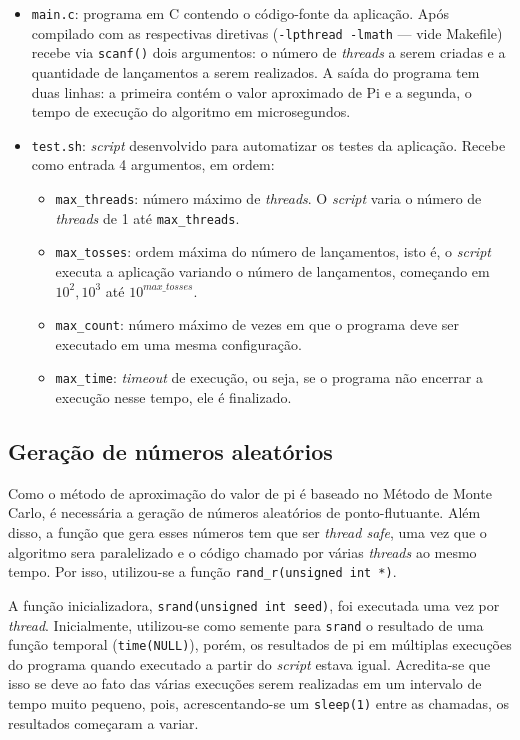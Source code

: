 \documentclass[12pt,a4paper]{article}
\begin{document}
\begin{itemize}
	\item \texttt{main.c}: programa em C contendo o código-fonte da aplicação. Após compilado com as respectivas diretivas
		(\texttt{-lpthread -lmath} --- vide Makefile) recebe via
		\texttt{scanf()} dois argumentos: o número de \textit{threads} a serem
		criadas e a quantidade de lançamentos a serem realizados. A saída do
		programa tem duas linhas: a primeira contém o valor aproximado de Pi e
		a segunda, o tempo de execução do algoritmo em microsegundos.
	\item \texttt{test.sh}: \textit{script} desenvolvido para automatizar os
		testes da aplicação. Recebe como entrada 4 argumentos, em ordem:
		\begin{itemize}
			\item \texttt{max\_threads}: número máximo de \textit{threads}. O
				\textit{script} varia o número de \textit{threads} de 1 até
				\texttt{max\_threads}.
			\item \texttt{max\_tosses}: ordem máxima do número de lançamentos, isto
				é, o \textit{script} executa a aplicação variando o 
				número de lançamentos, começando em $10^2, 10^3$ até $10^{max\_tosses}$.
			\item \texttt{max\_count}: número máximo de vezes em que o programa
				deve ser executado em uma mesma configuração.
			\item \texttt{max\_time}: \textit{timeout} de execução, ou seja, se o
				programa não encerrar a execução nesse tempo, ele é finalizado.
		\end{itemize}
\end{itemize}

\subsection{Geração de números aleatórios}
Como o método de aproximação do valor de pi é baseado no Método de Monte Carlo,
é necessária a geração de números aleatórios de ponto-flutuante. Além disso, a
função que gera esses números tem que ser \textit{thread safe}, uma vez que o
algoritmo sera paralelizado e o código chamado por várias \textit{threads} ao
mesmo tempo. Por isso, utilizou-se a função \texttt{rand\_r(unsigned int *)}.

A função inicializadora, \texttt{srand(unsigned int seed)}, foi executada uma
vez por \textit{thread}. Inicialmente, utilizou-se como semente para
\texttt{srand} o resultado de uma função temporal (\texttt{time(NULL)}), porém,
os resultados de pi em múltiplas execuções do programa quando executado a
partir do \textit{script} estava igual. Acredita-se que isso se deve ao fato
das várias execuções serem realizadas em um intervalo de tempo muito pequeno,
pois, acrescentando-se um \texttt{sleep(1)} entre as chamadas, os resultados
começaram a variar.
\end{document}
